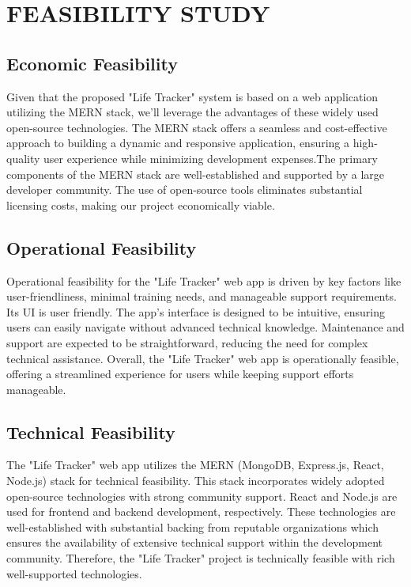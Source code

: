 \section{FEASIBILITY STUDY}
\subsection{Economic Feasibility}
Given that the proposed "Life Tracker" system is based on a web application utilizing the MERN stack, we'll leverage the advantages of these widely used open-source technologies. The MERN stack offers a seamless and cost-effective approach to building a dynamic and responsive application, ensuring a high-quality user experience while minimizing development expenses.The primary components of the MERN stack are well-established and supported by a large developer community. The use of open-source tools eliminates substantial licensing costs, making our project economically viable.
\subsection{Operational Feasibility}
Operational feasibility for the "Life Tracker" web app is driven by key factors like user-friendliness, minimal training needs, and manageable support requirements. Its UI is user friendly. The app's interface is designed to be intuitive, ensuring users can easily navigate without advanced technical knowledge. Maintenance and support are expected to be straightforward, reducing the need for complex technical assistance. Overall, the "Life Tracker" web app is operationally feasible, offering a streamlined experience for users while keeping support efforts manageable.

\subsection{Technical Feasibility}
The "Life Tracker" web app utilizes the MERN (MongoDB, Express.js, React, Node.js) stack for technical feasibility. This stack incorporates widely adopted open-source technologies with strong community support. React and Node.js are used for frontend and backend development, respectively. These technologies are well-established with substantial backing from reputable organizations which ensures the availability of extensive technical support within the development community. Therefore, the "Life Tracker" project is technically feasible with rich well-supported technologies.




